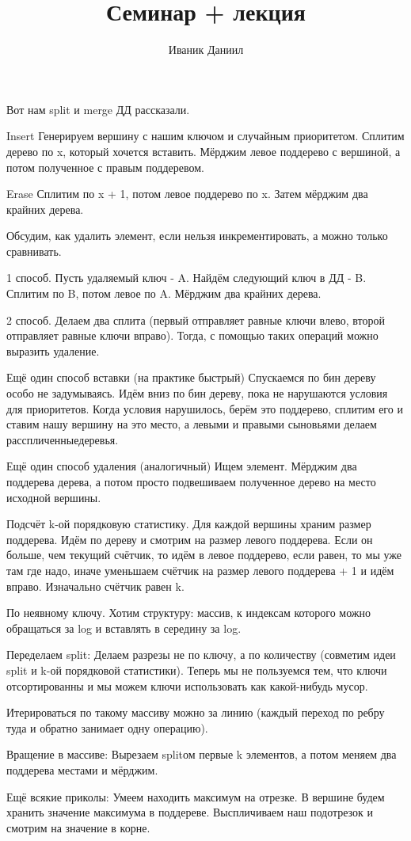 \documentclass{article}
\author{Иваник Даниил}
\title{Семинар + лекция}
\begin{document}
Вот нам split и merge ДД рассказали.

Insert
Генерируем вершину с нашим ключом и случайным приоритетом. Сплитим дерево по x, который хочется вставить. Мёрджим левое поддерево с вершиной, а потом полученное с правым поддеревом.

Erase
Сплитим по x + 1, потом левое поддерево по x. Затем мёрджим два крайних дерева.

Обсудим, как удалить элемент, если нельзя инкрементировать, а можно только сравнивать. 

1 способ. Пусть удаляемый ключ - A. Найдём следующий ключ в ДД - B. Сплитим по B, потом левое по A. Мёрджим два крайних дерева.

2 способ. Делаем два сплита (первый отправляет равные ключи влево, второй отправляет равные ключи вправо). Тогда, с помощью таких операций можно выразить удаление.

Ещё один способ вставки (на практике быстрый)
Спускаемся по бин дереву особо не задумываясь. Идём вниз по бин дереву, пока не нарушаются условия для приоритетов. Когда условия нарушилось, берём это поддерево, сплитим его и ставим нашу вершину на это место, а левыми и правыми сыновьями делаем расспличенныедеревья.

Ещё один способ удаления (аналогичный)
Ищем элемент. Мёрджим два поддерева дерева, а потом просто подвешиваем полученное дерево на место исходной вершины.

Подсчёт k-ой порядковую статистику. Для каждой вершины храним размер поддерева. Идём по дереву и смотрим на размер левого поддерева. Если он больше, чем текущий счётчик, то идём в левое поддерево, если равен, то мы уже там где надо, иначе уменьшаем счётчик на размер левого поддерева + 1 и идём вправо. Изначально счётчик равен k.


По неявному ключу.
Хотим структуру: массив, к индексам которого можно обращаться за log и вставлять в середину за log.

Переделаем split:
Делаем разрезы не по ключу, а по количеству (совметим идеи split и k-ой порядковой статистики). Теперь мы не пользуемся тем, что ключи отсортированны и мы можем ключи использовать как какой-нибудь мусор.

Итерироваться по такому массиву можно за линию (каждый переход по ребру туда и обратно занимает одну операцию).

Вращение в массиве:
Вырезаем splitом первые k элементов, а потом меняем два поддерева местами и мёрджим.

Ещё всякие приколы:
Умеем находить максимум на отрезке. В вершине будем хранить значение максимума в поддереве. Выспличиваем наш подотрезок и смотрим на значение в корне.
\end{document}
